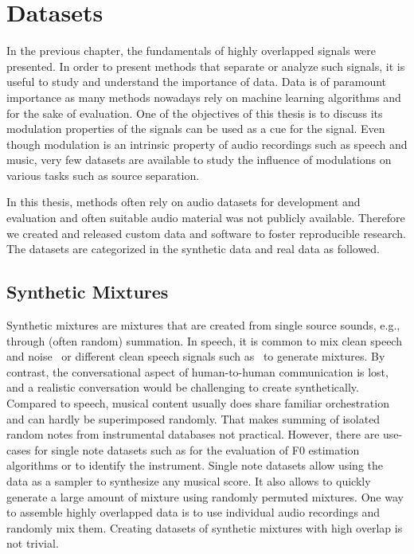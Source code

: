 \chapter{Datasets}
\label{cha:datasets}
In the previous chapter, the fundamentals of highly overlapped signals were presented.
In order to present methods that separate or analyze such signals, it is useful to study and understand the importance of data.
Data is of paramount importance as many methods nowadays rely on machine learning algorithms and for the sake of evaluation.
One of the objectives of this thesis is to discuss its modulation properties of the signals can be used as a cue for the signal.
Even though modulation is an intrinsic property of audio recordings such as speech and music, very few datasets are available to study the influence of modulations on various tasks such as source separation.
\par
In this thesis, methods often rely on audio datasets for development and evaluation and often suitable audio material was not publicly available. Therefore we created and released custom data and software to foster reproducible research.
The datasets are categorized in the synthetic data and real data as followed.

\section{Synthetic Mixtures}

Synthetic mixtures are mixtures that are created from single source sounds, e.g., through (often random) summation. 
In speech, it is common to mix clean speech and noise~\cite{varga93} or different clean speech signals such as~\cite{garofolo93} to generate mixtures.
By contrast, the conversational aspect of human-to-human communication is lost, and a realistic  conversation would be challenging to create synthetically.
Compared to speech, musical content usually does share familiar orchestration and can hardly be superimposed randomly. 
That makes summing of isolated random notes from instrumental databases not practical.
However, there are use-cases for single note datasets such as for the evaluation of F0 estimation algorithms or to identify the instrument.
Single note datasets allow using the data as a sampler to synthesize any musical score.
It also allows to quickly generate a large amount of mixture using randomly permuted mixtures.
One way to assemble highly overlapped data is to use individual audio recordings and randomly mix them.
Creating datasets of synthetic mixtures with high overlap is not trivial.

